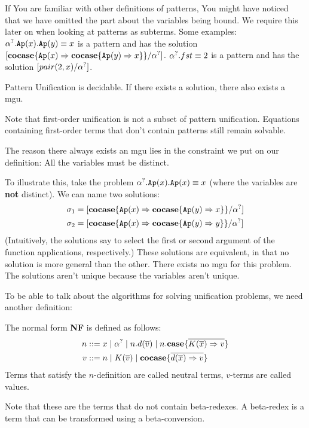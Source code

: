 \documentclass[twoside,12pt,a4paper]{article}
\begin{document}
If You are familiar with other definitions of patterns, You might have noticed that 
we have omitted the part about the variables being bound. We require this later on when looking at patterns as subterms.
Some examples:
$\alpha^?.\texttt{Ap}(x).\texttt{Ap}(y)\equiv x$ is a pattern and has the solution $[\textbf{cocase}\{\texttt{Ap}(x)\Rightarrow\textbf{cocase}\{\texttt{Ap}(y)\Rightarrow x\}\}/\alpha^?]$.
$\alpha^?.fst \equiv 2$ is a pattern and has the solution $[pair(2,x)/\alpha^?]$.


\begin{theorem}
    Pattern Unification is decidable. If there exists a solution, there also exists a mgu.
\end{theorem}

Note that first-order unification is not a subset of pattern unification. 
Equations containing first-order terms that don't contain patterns still remain solvable.

The reason there always exists an mgu lies in the constraint we put on our definition: All the variables must be distinct. 

To illustrate this, take the problem $\alpha^?.\texttt{Ap}(x).\texttt{Ap}(x)\equiv x$ (where the variables are \textbf{not} distinct). 
We can name two solutions:
\begin{align*}
    \sigma_1 &= [\textbf{cocase}\{\texttt{Ap}(x)\Rightarrow \textbf{cocase}\{\texttt{Ap}(y)\Rightarrow x\}\}/\alpha^?]\\
    \sigma_2 &=[\textbf{cocase}\{\texttt{Ap}(x)\Rightarrow \textbf{cocase}\{\texttt{Ap}(y)\Rightarrow y\}\}/\alpha^?]  
\end{align*}
(Intuitively, the solutions say to select the first or second argument of the function applications, respectively.)
These solutions are equivalent, in that no solution is more general than the other. There exists no mgu for this problem.
The solutions aren't unique because the variables aren't unique.

To be able to talk about the algorithms for solving unification problems, we need another definition: %
\begin{definition}
    The normal form \textbf{NF} is defined as follows:
    \begin{align*}
        n &::= x \;|\; \alpha^? \;|\; n.d(\overline{v})\;|\; n.\textbf{case}\{\overline{K(\overline{x})\Rightarrow v}\}\\
        v &::= n \;|\; K(\overline{v}) \;|\; \textbf{cocase}\{\overline{d(\overline{x})\Rightarrow v}\}
    \end{align*}
    Terms that satisfy the $n$-definition are called neutral terms, $v$-terms are called values.
\end{definition}
Note that these are the terms that do not contain beta-redexes. 
A beta-redex is a term that can be transformed using a beta-conversion.
\end{document}
